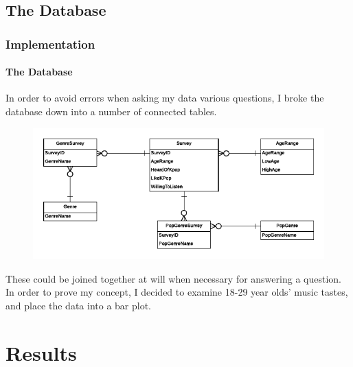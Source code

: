 \documentclass[aspectratio=1610]{beamer}
\begin{document}
\subsection{The Database}
\begin{frame}
\frametitle{Implementation}
\framesubtitle{The Database}
In order to avoid errors when asking my data various questions, I broke the database down into a number of connected tables.
\newline
\begin{figure}[h]
\includegraphics[scale=0.35]{Diagram}
\end{figure}
These could be joined together at will when necessary for answering a question.
In order to prove my concept, I decided to examine 18-29 year olds' music tastes, and place the data into a bar plot.
\end{frame}
\section{Results}
\end{document}
